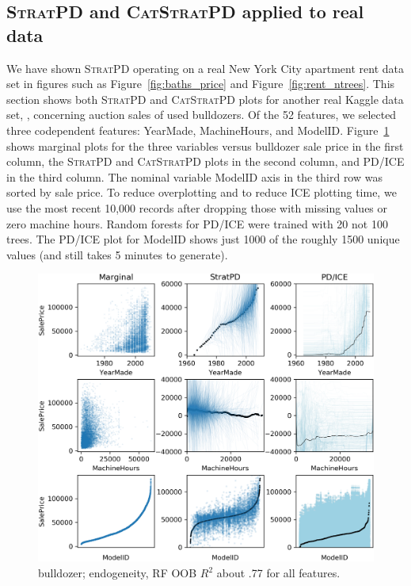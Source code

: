 \documentclass[12pt]{article}
\newcommand{\figref}[1]{Figure~\ref{#1}}
\newcommand{\spd}{\fontfamily{cmr}\textsc{\small StratPD}}
\newcommand{\cspd}{\fontfamily{cmr}\textsc{\small CatStratPD}}
\begin{document}
\subsection{\spd{} and \cspd{} applied to real data} 

We have shown \spd{} operating on a real New York City apartment rent data set in figures such as \figref{fig:baths_price} and \figref{fig:rent_ntrees}.  This section shows both \spd{} and \cspd{} plots for another real Kaggle data set, \cite{bulldozer}, concerning auction sales of used bulldozers.  Of the 52 features, we selected three codependent features: YearMade, MachineHours, and ModelID. \figref{fig:bulldozer} shows marginal plots for the three variables versus bulldozer sale price in the first column, the \spd{} and \cspd{} plots in the second column, and PD/ICE in the third column. The nominal variable ModelID axis in the third row was sorted by sale price. To reduce overplotting and to reduce ICE plotting time, we use the most recent 10,000 records after dropping those with missing values or zero machine hours. Random forests for PD/ICE were trained with 20 not 100 trees. The  PD/ICE plot for ModelID shows just 1000 of the roughly 1500 unique values (and still takes 5 minutes to generate).

\begin{figure}[htbp]
\begin{center}
\includegraphics[scale=0.7]{images/bulldozer.png}
\caption{bulldozer; endogeneity, RF OOB $R^2$ about .77 for all features.}
\label{fig:bulldozer}
\end{center}
\end{figure}
\end{document}
